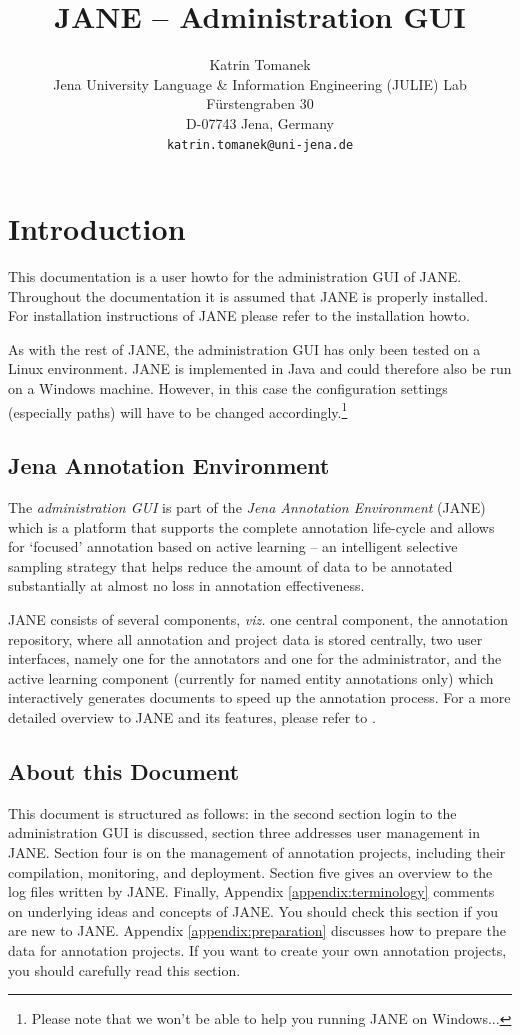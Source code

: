 \documentclass[DIV12,english,11pt,halfparskip]{scrartcl}
\title{JANE -- Administration GUI}
\author{\normalsize Katrin Tomanek\\
  \normalsize  Jena University Language \& Information Engineering (JULIE) Lab\\
  \normalsize F\"urstengraben 30 \\
  \normalsize D-07743 Jena, Germany\\
  {\normalsize \tt katrin.tomanek@uni-jena.de} } \date{}
\begin{document}
\maketitle
\newpage
\tableofcontents
\newpage


\section{Introduction}


This documentation is a user howto for the administration GUI of JANE.
Throughout the documentation it is assumed that JANE is properly
installed.  For installation instructions of JANE please refer to the
installation howto.

As with the rest of JANE, the administration GUI has only been tested
on a Linux environment. JANE is implemented in Java and could therefore
also be run on a Windows machine. However, in this case the
configuration settings (especially paths) will have to be changed
accordingly.\footnote{Please note that we won't be able to help you
  running JANE on Windows...}


\subsection{Jena Annotation Environment}

The \emph{administration GUI} is part of the \emph{Jena Annotation
  Environment} (JANE) which is a platform that supports the complete
annotation life-cycle and allows for `focused' annotation based on
active learning -- an intelligent selective sampling strategy that
helps reduce the amount of data to be annotated substantially at
almost no loss in annotation effectiveness.

JANE consists of several components, \textit{viz.} one central
component, the annotation repository, where all annotation and project
data is stored centrally, two user interfaces, namely one for the
annotators and one for the administrator, and the active learning
component (currently for named entity annotations only) which
interactively generates documents to speed up the annotation
process. For a more detailed overview to JANE and its features, please
refer to \cite{Tomanek2007law}.


\subsection{About this Document}

This document is structured as follows: in the second section login to
the administration GUI is discussed, section three addresses user
management in JANE. Section four is on the management of annotation
projects, including their compilation, monitoring, and deployment.
Section five gives an overview to the log files written by JANE.
Finally, Appendix \ref{appendix:terminology} comments on underlying
ideas and concepts of JANE. You should check this section if you are
new to JANE.  Appendix \ref{appendix:preparation} discusses how to
prepare the data for annotation projects. If you want to create your
own annotation projects, you should carefully read this section.
\end{document}

